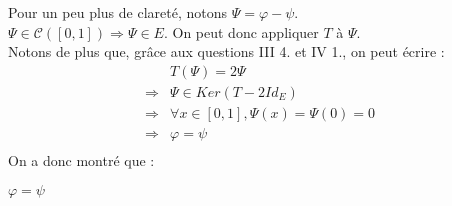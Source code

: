Pour un peu plus de clareté, notons $\Psi = \varphi-\psi.$\\
$\Psi \in \mathcal{C}([0, 1])\Rightarrow\Psi\in E$. On peut donc appliquer $T$ à $\Psi$.\\

Notons de plus que, grâce aux questions III 4. et IV 1., on peut écrire :
\[
  \begin{array}{rl}
                & T(\Psi) = 2\Psi                             \\
    \Rightarrow & \Psi\in Ker(T-2Id_E)                        \\
    \Rightarrow & \forall x \in [0, 1], \Psi(x) = \Psi(0) = 0 \\
    \Rightarrow & \varphi=\psi                                \\
  \end{array}
\]
On a donc montré que : 
\begin{result}
  $\varphi=\psi $
\end{result}
